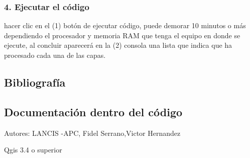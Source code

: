 \documentclass[letterpaper,10pt,spanish]{sphinxmanual}
\begin{document}
\begin{sphinxVerbatim}[commandchars=\\\{\}]
  
\end{sphinxVerbatim}


\subsubsection{4. Ejecutar el código}
\label{\detokenize{analisis:ejecutar-el-codigo}}
hacer clic en el (1) botón de ejecutar código, puede demorar 10 minutos o más dependiendo el procesador y
memoria RAM que tenga el equipo en donde se ejecute, al concluir aparecerá en la (2) consola una lista que indica que
ha procesado cada una de las capas.

\noindent{}


\subsection{Bibliografía}
\label{\detokenize{analisis:bibliografia}}

\subsection{Documentación dentro del código}
\label{\detokenize{analisis:module-sensibilidad_por_remocion_capas}}\label{\detokenize{analisis:documentacion-dentro-del-codigo}}
Autores: LANCIS -APC, Fidel Serrano,Victor Hernandez

Qgis 3.4 o superior
\end{document}
